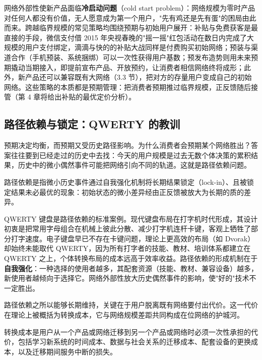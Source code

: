 网络外部性使新产品面临\textbf{冷启动问题}（cold start problem）：网络规模为零时产品对任何人都没有价值，无人愿意成为第一个用户，"先有鸡还是先有蛋"的困局由此而来。跨越临界规模的常见策略均围绕预期与初始用户展开：补贴与免费获客是最直接的手段，微信支付借 2015 年央视春晚的"摇一摇"红包活动在数日内完成了大规模的用户支付绑定，滴滴与快的的补贴大战同样是付费购买初始网络；预装与渠道合作（手机预装、系统捆绑）可以一次性获得用户基数；预发布造势则用未来预期撬动当期接入，即提前宣布产品、开放预约，让消费者相信网络终将成形；此外，新产品还可以兼容既有大网络（3.3 节），把对方的存量用户变成自己的初始网络。这些策略的本质都是预期管理：把消费者预期推过临界规模，正反馈随后接管（第 4 章将给出补贴的最优定价分析）。

\subsection{路径依赖与锁定：QWERTY 的教训}

预期决定均衡，而预期又受历史路径影响。为什么消费者会预期某个网络胜出？答案往往要到已经走过的历史中去找：今天的用户规模是过去无数个体决策的累积结果，历史中的微小偶然事件可能把网络引向不同的轨道。这就是路径依赖问题。

\begin{definition}
路径依赖是指微小历史事件通过自我强化机制将长期结果锁定（lock-in）、且被锁定结果未必最优的现象：初始状态的微小差异经由正反馈被放大为长期的质的差异。
\end{definition}

QWERTY 键盘是路径依赖的标准案例。现代键盘布局在打字机时代形成，其设计初衷是把常用字母组合在机械上彼此分散、减少打字机连杆卡键，客观上牺牲了部分打字速度。电子键盘早已不存在卡键问题，理论上更高效的布局（如 Dvorak）却始终未能取代 QWERTY，因为所有打字者的技能、教材、培训体系都建立在 QWERTY 之上，个体转换布局的成本远高于效率收益。路径依赖的形成机制在于\textbf{自我强化}：一种选择的使用者越多，其配套资源（技能、教材、兼容设备）越多，新使用者越倾向于选择它。网络外部性放大历史偶然事件的影响，使"好的"技术不一定胜出。

路径依赖之所以能够长期维持，关键在于用户脱离既有网络要付出代价。这一代价在理论上被概括为转换成本，它与网络规模差距共同构成在位网络的护城河。

\begin{definition}
转换成本是用户从一个产品或网络迁移到另一个产品或网络时必须一次性承担的代价，包括学习新系统的时间成本、数据与社会关系的迁移成本、配套设备的更换成本，以及迁移期间服务中断的损失。
\end{definition}

